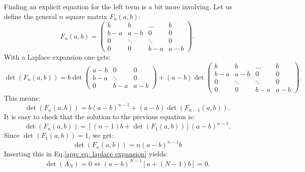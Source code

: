 \documentclass[12pt]{report}
\begin{document}
Finding an explicit equation for the left term is a bit more involving. Let us define the general $n$ square matrix $F_n(a,b)$:
\begin{equation}
F_n(a,b) = \begin{pmatrix}
b & b & \dots & b \\
b-a & a-b & 0 & 0 \\
0 & \ddots & \ddots & 0 \\
0 & 0 & b-a & a-b
\end{pmatrix}.
\end{equation}
With a Laplace expansion one gets:
\begin{equation}
\det\left(F_n(a,b)\right)= b
\det\begin{pmatrix}
a-b & 0 & 0 \\
b-a & \ddots & 0 \\
0 & b-a & a-b
\end{pmatrix}+(a-b)\det\begin{pmatrix}
b & b & \dots & b \\
b-a & a-b & 0 & 0 \\
0 & \ddots & \ddots & 0 \\
0 & 0 & b-a & a-b
\end{pmatrix}.
\end{equation}
This means:
\begin{equation}
\det(F_n(a,b))=b(a-b)^{n-1}+(a-b)\det(F_{n-1}(a,b)).
\end{equation}
It is easy to check that the solution to the previous equation is:
\begin{equation}
\det(F_n(a,b))=\left[(n-1)b+\det\left(F_1(a,b)\right)\right](a-b)^{n-1}.
\end{equation}
Since $\det\left(F_1(a,b)\right)=1$, we get:
\begin{equation}
\det\left(F_n(a,b)\right)=n(a-b)^{n-1}b
\end{equation}
Inserting this in Eq.\eqref{app: eq: laplace expansion} yields:
\begin{equation}
\boxed{
\det(A_N)=0 \iff (a-b)^{N-1}\left[a+(N-1)b\right]=0.
}\label{eq: formula special determinant}
\end{equation}
\end{document}
